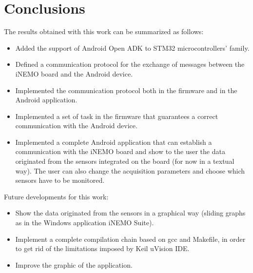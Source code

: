 \section{Conclusions}
\label{conclusions}

The results obtained with this work can be summarized as follows:

\begin{itemize}
	\item Added the support of Android Open ADK to STM32 microcontrollers' family.
	\item Defined a communication protocol for the exchange of messages between the iNEMO board and the Android device.
	\item Implemented the communication protocol both in the firmware and in the Android application.
	\item Implemented a set of task in the firmware that guarantees a correct communication with the Android device.
	\item Implemented a complete Android application that can establish a communication with the iNEMO board and show to the user the data originated from the sensors integrated on the board (for now in a textual way). The user can also change the acquisition parameters and choose which sensors have to be monitored.
\end{itemize}


Future developments for this work:

\begin{itemize}
	\item Show the data originated from the sensors in a graphical way (sliding graphs as in the Windows application iNEMO Suite).
	\item Implement a complete compilation chain based on gcc and Makefile, in order to get rid of the limitations imposed by Keil uVision IDE.
	\item Improve the graphic of the application.
\end{itemize}
